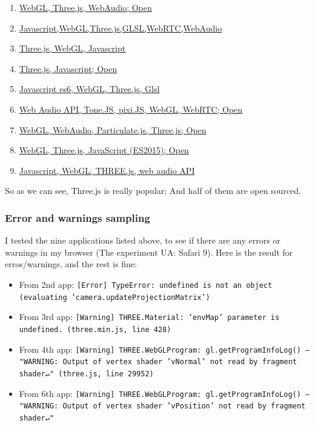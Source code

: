 \documentclass[]{article}
\begin{document}
\begin{enumerate}
\def\labelenumi{\arabic{enumi}.}
\itemsep1pt\parskip0pt
\item
  \href{https://www.chromeexperiments.com/experiment/lines}{WebGL,
  Three.js, WebAudio; Open}
\item
  \href{https://www.chromeexperiments.com/experiment/gaze}{Javascript,WebGL,Three.js,GLSL,WebRTC,WebAudio}
\item
  \href{https://www.chromeexperiments.com/experiment/world}{Three.js,
  WebGL, Javascript}
\item
  \href{https://www.chromeexperiments.com/experiment/infinite-city}{Three.js,
  Javascript; Open}
\item
  \href{https://www.chromeexperiments.com/experiment/amalgame}{Javascript
  es6, WebGL, Three.js, Glsl}
\item
  \href{https://www.chromeexperiments.com/experiment/music-lab}{Web
  Audio API, Tone.JS, pixi.JS, WebGL, WebRTC; Open}
\item
  \href{https://www.chromeexperiments.com/experiment/medusae}{WebGL,
  WebAudio, Particulate.js, Three.js; Open}
\item
  \href{https://www.chromeexperiments.com/experiment/4dvj}{WebGL,
  Three.js, JavaScript (ES2015); Open}
\item
  \href{https://www.chromeexperiments.com/experiment/one-million-stars}{Javascript,
  WebGL, THREE.js, web audio API}
\end{enumerate}

So as we can see, Three.js is really popular; And half of them are open
sourced.

\subsubsection{Error and warnings
sampling}\label{error-and-warnings-sampling}

I tested the nine applications listed above, to see if there are any
errors or warnings in my browser (The experiment UA: Safari 9). Here is
the result for erros/warnings, and the rest is fine:

\begin{itemize}
\itemsep1pt\parskip0pt
\item
  From 2nd app:
  \texttt{{[}Error{]} TypeError: undefined is not an object (evaluating 'camera.updateProjectionMatrix')}
\item
  From 3rd app:
  \texttt{{[}Warning{]} THREE.Material: 'envMap' parameter is undefined. (three.min.js, line 428)}
\item
  From 4th app:
  \texttt{{[}Warning{]} THREE.WebGLProgram: gl.getProgramInfoLog() – "WARNING: Output of vertex shader 'vNormal' not read by fragment shader↵" (three.js, line 29952)}
\item
  From 6th app:
  \texttt{{[}Warning{]} THREE.WebGLProgram: gl.getProgramInfoLog() – "WARNING: Output of vertex shader 'vPosition' not read by fragment shader↵"}
\end{itemize}
\end{document}

